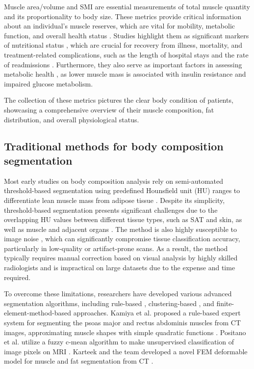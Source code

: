 Muscle area/volume and SMI are essential measurements of total muscle quantity and its proportionality to body size. These metrics provide critical information about an individual’s muscle reserves, which are vital for mobility, metabolic function, and overall health status \citep{chen2023really}. Studies highlight them as significant markers of nutritional status \citep{risch2022assessment}, which are crucial for recovery from illness, mortality, and treatment-related complications, such as the length of hospital stays and the rate of readmissions \citep{schuetz2021management, kaegi2021evaluation, guenter2021malnutrition}. Furthermore, they also serve as important factors in assessing metabolic health \citep{cruz2019sarcopenia, prado2014lean, martin2013cancer, dodds2015epidemiology}, as lower muscle mass is associated with insulin resistance and impaired glucose metabolism.

The collection of these metrics pictures the clear body condition of patients, showcasing a comprehensive overview of their muscle composition, fat distribution, and overall physiological status.

\subsection{Traditional methods for body composition segmentation}
Most early studies on body composition analysis rely on semi-automated threshold-based segmentation using predefined Hounsfield unit (HU) ranges to differentiate lean muscle mass from adipose tissue \citep{lee2017pixel, ji2022thresholds}. Despite its simplicity, threshold-based segmentation presents significant challenges due to the overlapping HU values between different tissue types, such as SAT and skin, as well as muscle and adjacent organs \citep{lee2017pixel}. The method is also highly susceptible to image noise \citep{sehgal2022ct, diwakar2020ct}, which can significantly compromise tissue classification accuracy, particularly in low-quality or artifact-prone scans. As a result, the method typically requires manual correction based on visual analysis by highly skilled radiologists and is impractical on large datasets due to the expense and time required.

To overcome these limitations, researchers have developed various advanced segmentation algorithms, including rule-based \citep{kamiya2009automated, kamiya2011automated}, clustering-based \citep{positano2009accurate, positano2004accurate, christ2011fuzzy}, and finite-element-method-based \citep{popuri2015body} approaches. Kamiya et al. proposed a rule-based expert system for segmenting the psoas major and rectus abdominis muscles from CT images, approximating muscle shapes with simple quadratic functions \citep{kamiya2009automated, kamiya2011automated}. Positano et al. utilize a fuzzy c-mean algorithm to make unsupervised classification of image pixels on MRI \citep{positano2009accurate, positano2004accurate}. Karteek and the team developed a novel FEM deformable model for muscle and fat segmentation from CT \citep{popuri2015body}.


